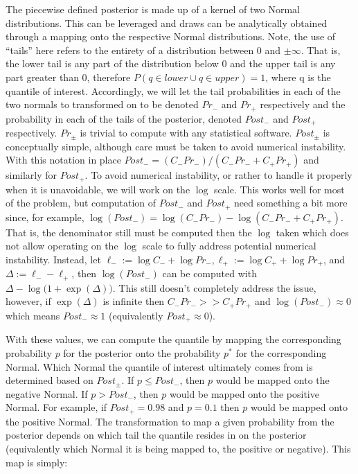 The piecewise defined posterior is made up of a kernel of two Normal distributions. This can be leveraged and draws can be analytically obtained through a mapping onto the respective Normal distributions. Note, the use of ``tails'' here refers to the entirety of a distribution between 0 and $\pm \infty$. That is, the lower tail is any part of the distribution below 0 and the upper tail is any part greater than 0, therefore $P(q \in lower \cup q \in upper) = 1$, where q is the quantile of interest. Accordingly, we will let the tail probabilities in each of the two normals to transformed on to be denoted $Pr_{-}$ and $Pr_{+}$ respectively and the probability in each of the tails of the posterior, denoted $Post_{-}$ and $Post_{+}$ respectively. $Pr_{\pm}$ is trivial to compute with any statistical software. $Post_{\pm}$ is conceptually simple, although care must be taken to avoid numerical instability. With this notation in place $Post_- = (C_{-} Pr_{-})/(C_{-} Pr_{-} + C_{+} Pr_{+})$ and similarly for $Post_+$. To avoid numerical instability, or rather to handle it properly when it is unavoidable, we will work on the $\log$ scale. This works well for most of the problem, but computation of $Post_-$ and $Post_+$ need something a bit more since, for example, $\log(Post_-) = \log(C_{-}Pr_{-}) - \log(C_{-} Pr_{-} + C_{+} Pr_{+})$. That is, the denominator still must be computed then the $\log$ taken which does not allow operating on the $\log$ scale to fully address potential numerical instability. Instead, let $\ell_{-} := \log C_{-} + \log Pr_{-}, \ell_{+} := \log C_{+} + \log Pr_{+}$, and $\Delta := \ell_{-} - \ell_{+}$, then $\log(Post_-)$ can be computed with $\Delta - \log\bigl(1 + \exp(\Delta)\bigr)$. This still doesn't completely address the issue, however, if $\exp(\Delta)$ is infinite then $C_-Pr_- >> C_+Pr_+$ and $\log(Post_-) \approx 0$ which means $Post_- \approx 1$ (equivalently $Post_+ \approx 0$).

With these values, we can compute the quantile by mapping the corresponding probability $p$ for the posterior onto the probability $p^*$ for the corresponding Normal. Which Normal the quantile of interest ultimately comes from is determined based on $Post_{\pm}$. If $p \leq Post_{-}$, then $p$ would be mapped onto the negative Normal. If $p > Post_{-}$, then $p$ would be mapped onto the positive Normal.  For example, if $Post_{+} = 0.98$ and $p = 0.1$ then $p$ would be mapped onto the positive Normal. The transformation to map a given probability from the posterior depends on which tail the quantile resides in on the posterior (equivalently which Normal it is being mapped to, the positive or negative). This map is simply:

